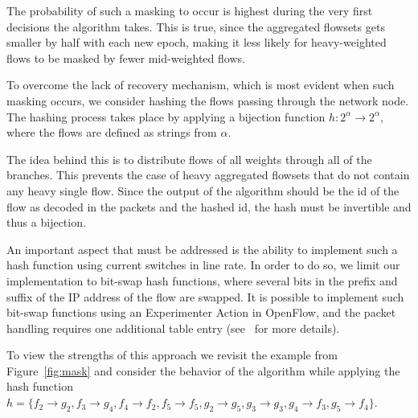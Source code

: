 The probability of such a masking to occur is highest during the very first decisions the algorithm takes. This is true, since the aggregated flowsets gets smaller by half with each new epoch, making it less likely for heavy-weighted flows to be masked by fewer mid-weighted flows.

To overcome the lack of recovery mechanism, which is most evident when such masking occurs, we consider hashing the flows passing through the network node. The hashing process takes place by applying a bijection function $h:2^{\alpha} \rightarrow 2^{\alpha}$, where the flows are defined as strings from $\alpha$.

The idea behind this is to distribute flows of all weights through all of the branches. This prevents the case of heavy aggregated flowsets that do not contain any heavy single flow. Since the output of the algorithm should be the id of the flow as decoded in the packets and the hashed id, the hash must be invertible and thus a bijection.

An important aspect that must be addressed is the ability to implement such a hash function using current switches in line rate.  In order to do so, we limit our implementation to bit-swap hash functions, where several bits in the prefix and suffix of the IP address of the flow are swapped.  It is possible to implement such bit-swap functions using an Experimenter Action in OpenFlow, and the packet handling requires one additional table entry (see~\cite{OF1.5} for more details).

To view the strengths of this approach we revisit the example from Figure~\ref{fig:mask} and consider the behavior of the algorithm while applying the hash function $h = \{f_2\rightarrow g_2, f_3\rightarrow g_4, f_4\rightarrow f_2, f_5\rightarrow f_5, g_2\rightarrow g_5, g_3\rightarrow g_3, g_4\rightarrow f_3, g_5\rightarrow f_4\}$.

